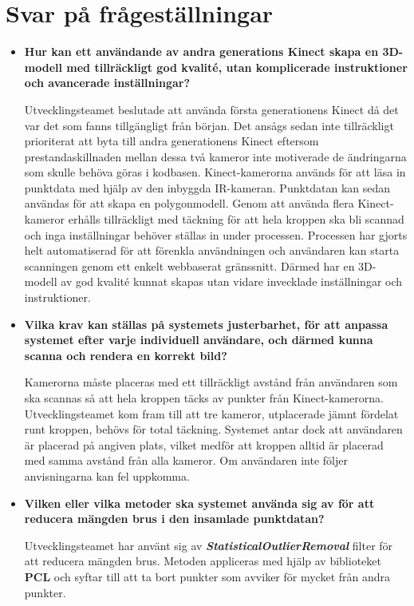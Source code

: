 \documentclass[a4paper,12pt,oneside,final]{extbook}
\begin{document}
\section{Svar på frågeställningar}
\begin{itemize}
\item \textbf{Hur kan ett användande av andra generations Kinect skapa en 3D-modell med tillräckligt god kvalité, utan komplicerade instruktioner och avancerade inställningar?}

Utvecklingsteamet beslutade att använda första generationens Kinect då det var det som fanns tillgängligt från början. Det ansågs sedan inte tillräckligt prioriterat att byta till andra generationens Kinect eftersom prestandaskillnaden mellan dessa två kameror inte motiverade de ändringarna som skulle behöva göras i kodbasen. Kinect-kamerorna används för att läsa in punktdata med hjälp av den inbyggda IR-kameran. Punktdatan kan sedan användas för att skapa en polygonmodell. Genom att använda flera Kinect-kameror erhålls tillräckligt med täckning för att hela kroppen ska bli scannad och inga inställningar behöver ställas in under processen. Processen har gjorts helt automatiserad för att förenkla användningen och användaren kan starta scanningen genom ett enkelt webbaserat gränssnitt. Därmed har en 3D-modell av god kvalité kunnat skapas utan vidare invecklade inställningar och instruktioner.


\item \textbf{Vilka krav kan ställas på systemets justerbarhet, för att anpassa systemet efter varje individuell användare, och därmed kunna scanna och rendera en korrekt bild?}

Kamerorna måste placeras med ett tillräckligt avstånd från användaren som ska scannas så att hela kroppen täcks av punkter från Kinect-kamerorna. Utvecklingsteamet kom fram till att tre kameror, utplacerade jämnt fördelat runt kroppen, behövs för total täckning. Systemet antar dock att användaren är placerad på angiven plats, vilket medför att kroppen alltid är placerad med samma avstånd från alla kameror. Om användaren inte följer anvisningarna kan fel uppkomma.

\item \textbf{Vilken eller vilka metoder ska systemet använda sig av för att reducera mängden brus i den insamlade punktdatan?}

Utvecklingsteamet har använt sig av \emph{\textbf{StatisticalOutlierRemoval}} filter för att reducera mängden brus. Metoden appliceras med hjälp av biblioteket \textbf{PCL} och syftar till att ta bort punkter som avviker för mycket från andra punkter.


\end{itemize}
\end{document}
